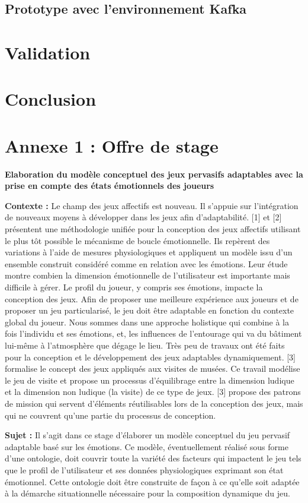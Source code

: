 \documentclass{article}
\begin{document}
	\subsection{Prototype avec l'environnement Kafka}

\section{Validation}

\section{Conclusion}


\newpage
\appendix
\section{Annexe 1 : Offre de stage}\label{app:annexe1}
	\textbf{Elaboration du modèle conceptuel des jeux pervasifs adaptables avec la prise en compte des états émotionnels des joueurs}\par
	\medskip
	\textbf{Contexte :}\newline
	Le champ des jeux affectifs est nouveau. Il s’appuie sur l’intégration de nouveaux moyens à développer dans les jeux afin d’adaptabilité. [1] et [2] présentent une méthodologie unifiée pour la conception des jeux affectifs utilisant le plus tôt possible le mécanisme de boucle émotionnelle. Ils repèrent des variations à l’aide de mesures physiologiques et appliquent un modèle issu d’un ensemble construit considéré comme en relation avec les émotions. Leur étude montre combien la dimension émotionnelle de l’utilisateur est importante mais difficile à gérer.\newline
	Le profil du joueur, y compris ses émotions, impacte la conception des jeux. Afin de proposer une meilleure expérience aux joueurs et de proposer un jeu particularisé, le jeu doit être adaptable en fonction du contexte global du joueur. Nous sommes dans une approche holistique qui combine à la fois l’individu et ses émotions, et, les influences de l’entourage qui va du bâtiment lui-même à l’atmosphère que dégage le lieu. Très peu de travaux ont été faits pour la conception et le développement des jeux adaptables dynamiquement. [3] formalise le concept des jeux appliqués aux visites de musées. Ce travail modélise le jeu de visite et propose un processus d’équilibrage entre la dimension ludique et la dimension non ludique (la visite) de ce type de jeux. [3] propose des patrons de mission qui servent d’éléments réutilisables lors de la conception des jeux, mais qui ne couvrent qu’une partie du processus de conception.\par
	\textbf{Sujet :}\newline
	Il s’agit dans ce stage d’élaborer un modèle conceptuel du jeu pervasif adaptable basé sur les émotions. Ce modèle, éventuellement réalisé sous forme d’une ontologie, doit couvrir toute la variété des facteurs qui impactent le jeu tels que le profil de l’utilisateur et ses données physiologiques exprimant son état émotionnel. Cette ontologie doit être construite de façon à ce qu’elle soit adaptée à la démarche situationnelle nécessaire pour la composition dynamique du jeu.
\end{document}
